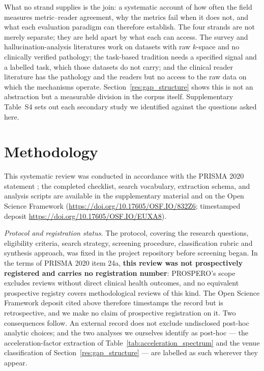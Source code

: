 \documentclass[review,authoryear]{elsarticle}
\begin{document}
What no strand supplies is the join: a systematic account of how often the field measures
metric--reader agreement, why the metrics fail when it does not, and what each evaluation
paradigm can therefore establish. The four strands are not merely separate; they are held
apart by what each can access. The survey and hallucination-analysis literatures work on
datasets with raw $k$-space and no clinically verified pathology; the task-based tradition
needs a specified signal and a labelled task, which those datasets do not carry; and the
clinical reader literature has the pathology and the readers but no access to the raw data
on which the mechanisms operate. Section~\ref{res:gap_structure} shows this is not an
abstraction but a measurable division in the corpus itself. Supplementary Table~S4 sets out
each secondary study we identified against the questions asked here.

\section{Methodology}
\label{sec:methods}

This systematic review was conducted in accordance with the PRISMA 2020 statement
\citep{prisma2020}; the completed checklist, search vocabulary, extraction schema, and
analysis scripts are available in the supplementary material and on the Open Science
Framework (\url{https://doi.org/10.17605/OSF.IO/832Z6}; timestamped deposit \url{https://doi.org/10.17605/OSF.IO/EUXA8}).

\emph{Protocol and registration status.} The protocol, covering the research questions,
eligibility criteria, search strategy, screening procedure, classification rubric and
synthesis approach, was fixed in the project repository before screening began. In the
terms of PRISMA 2020 item 24a, \textbf{this review was not prospectively registered and
carries no registration number}: PROSPERO's scope excludes reviews without direct clinical
health outcomes, and no equivalent prospective registry covers methodological reviews of
this kind. The Open Science Framework deposit cited above therefore timestamps the record
but is retrospective, and we make no claim of prospective registration on it. Two
consequences follow. An external record does not exclude undisclosed post-hoc analytic
choices; and the two analyses we ourselves identify as post-hoc --- the acceleration-factor
extraction of Table~\ref{tab:acceleration_spectrum} and the venue classification of
Section~\ref{res:gap_structure} --- are labelled as such wherever they appear.
\end{document}

